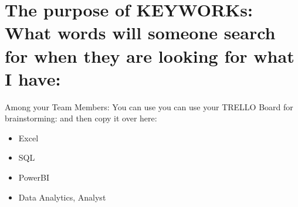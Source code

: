 \section{The purpose of KEYWORKs: What words will someone search for when they are looking for what I have:}

Among your Team Members: You can use you can use your TRELLO Board for brainstorming: and then copy it over here:

\begin{itemize}
    \item Excel
    \item SQL
    \item PowerBI
    \item Data Analytics, Analyst
\end{itemize}